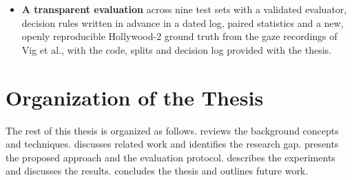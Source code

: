 \begin{itemize}
    speaker could not be built from the released frames. A fifth, a decoder
    state carried from one window to the next, halves the encoder computation
    per output frame and is more accurate than overlapping windows within the
    same training runs, but its gain over the separately trained model could
    not be established.
  \item \textbf{A transparent evaluation} across nine test sets with a validated
    evaluator, decision rules written in advance in a dated log, paired
    statistics and a new,
    openly reproducible Hollywood-2 ground truth from the gaze recordings of Vig
    et al., with the code, splits and decision log provided with the thesis.
\end{itemize}

\section{Organization of the Thesis}\label{sec:organization}

The rest of this thesis is organized as follows.
 reviews the background concepts and techniques.
 discusses related work and identifies the research gap.
 presents the proposed approach and the evaluation protocol.
 describes the experiments and discusses the results.
 concludes the thesis and outlines future work.

